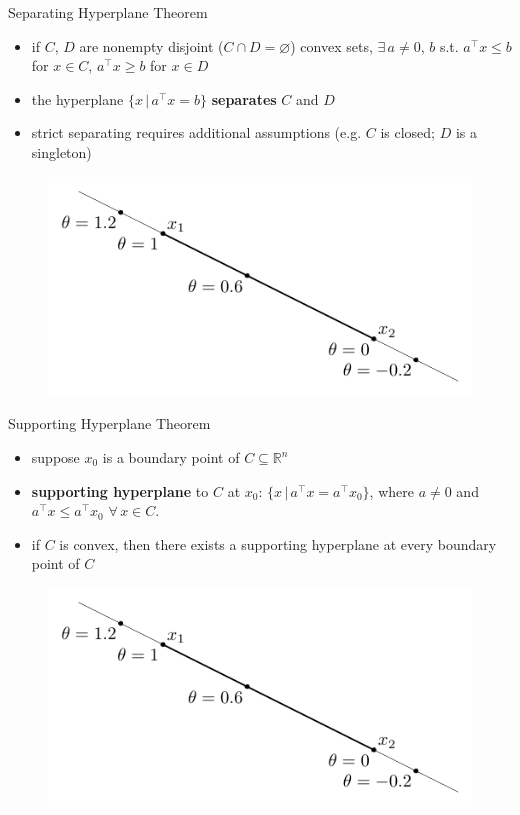 \documentclass[10pt,handout]{beamer}
\newcommand{\ds}{\displaystyle}
\theoremstyle{definition}
\begin{document}
\begin{frame}{Separating Hyperplane Theorem}
  \begin{itemize}
    \item if $C$, $D$ are nonempty disjoint ($C\cap D=\varnothing$) convex sets, $\exists\,a\ne 0$, $b$ s.t. $\ds a^\top x\leqslant b$ for $x\in C$, $a^\top x\geqslant b$ for $x\in D$ 
    \item the hyperplane $\ds\{x\,|\,a^\top x = b\}$ {\bf separates} $C$ and $D$
    \item strict separating requires additional assumptions (e.g. $C$ is closed; $D$ is a singleton)
  \end{itemize}
  \begin{figure}[!htbp]
    \centering
    \includegraphics[scale=0.91,page=18]{fig/note06/02.pdf}
  \end{figure}
\end{frame}

\begin{frame}{Supporting Hyperplane Theorem}
  \begin{itemize}
    \item suppose $x_0$ is a boundary point of $C\subseteq\mathbb{R}^n$
    \item {\bf supporting hyperplane} to $C$ at $x_0$: $\{x\,|\,a^\top x = a^\top x_0\}$, where $a\ne 0$ and $a^\top x\leqslant a^\top x_0$ $\forall\,x\in C$. 
    \item if $C$ is convex, then there exists a supporting hyperplane at every boundary point of $C$ 
  \end{itemize}
  \begin{figure}[!htbp]
    \centering
    \includegraphics[scale=0.91,page=21]{fig/note06/02.pdf}
  \end{figure}
\end{frame}
\end{document}
